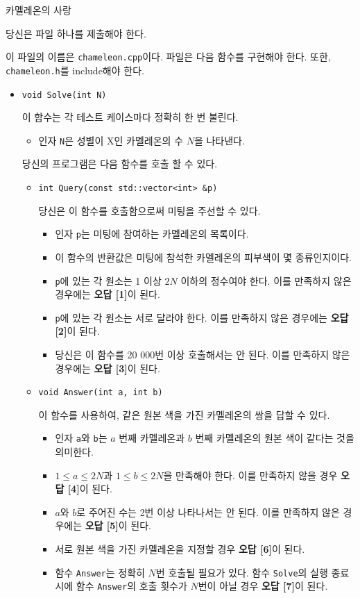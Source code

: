 \begin{problem}{카멜레온의 사랑}
	\Specification
	
	당신은 파일 하나를 제출해야 한다.
	
	이 파일의 이름은 \texttt{chameleon.cpp}이다. 파일은 다음 함수를 구현해야 한다. 또한, \texttt{chameleon.h}를 include해야 한다.
	
	\begin{itemize}
		\item \texttt{void Solve(int N)}
		
		이 함수는 각 테스트 케이스마다 정확히 한 번 불린다.
		\begin{itemize}
			\item 인자 \texttt{N}은 성별이 X인 카멜레온의 수 $N$을 나타낸다.
		\end{itemize}
		
		당신의 프로그램은 다음 함수를 호출 할 수 있다.
		\begin{itemize}
			\item \texttt{int Query(const std::vector<int> \&p)}
			
			당신은 이 함수를 호출함으로써 미팅을 주선할 수 있다.
			
			\begin{itemize}
				\item 인자 \texttt{p}는 미팅에 참여하는 카멜레온의 목록이다.
				\item 이 함수의 반환값은 미팅에 참석한 카멜레온의 피부색이 몇 종류인지이다.
				\item \texttt{p}에 있는 각 원소는 1 이상 $2N$ 이하의 정수여야 한다. 이를 만족하지 않은 경우에는 \textbf{오답 [1]}이 된다.
				\item \texttt{p}에 있는 각 원소는 서로 달라야 한다. 이를 만족하지 않은 경우에는 \textbf{오답 [2]}이 된다.
				\item 당신은 이 함수를 20 000번 이상 호출해서는 안 된다. 이를 만족하지 않은 경우에는 \textbf{오답 [3]}이 된다.
			\end{itemize}
			
			\item \texttt{void Answer(int a, int b)}
			
			이 함수를 사용하여, 같은 원본 색을 가진 카멜레온의 쌍을 답할 수 있다.
			
			\begin{itemize}
				\item 인자 \texttt{a}와 \texttt{b}는 $a$ 번째 카멜레온과 $b$ 번째 카멜레온의 원본 색이 같다는 것을 의미한다.
				\item $1 \le a \le 2N$과 $1 \le b \le 2N$을 만족해야 한다. 이를 만족하지 않을 경우 \textbf{오답 [4]}이 된다.
				\item $a$와 $b$로 주어진 수는 2번 이상 나타나서는 안 된다. 이를 만족하지 않은 경우에는 \textbf{오답 [5]}이 된다.
				\item 서로 원본 색을 가진 카멜레온을 지정할 경우 \textbf{오답 [6]}이 된다.
				\item 
				함수 \texttt{Answer}는 정확히 $N$번 호출될 필요가 있다. 함수 \texttt{Solve}의 실행 종료 시에 함수 \texttt{Answer}의 호출 횟수가 $N$번이 아닐 경우 \textbf{오답 [7]}이 된다.
			\end{itemize}
			

\end{itemize}
\end{itemize}
\end{problem}
